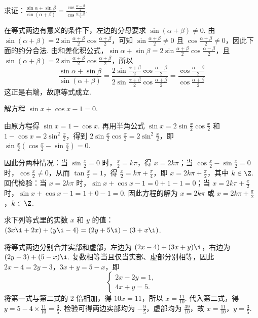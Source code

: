 \begin{problem}
求证：\(\frac{\sin\alpha+\sin\beta}{\sin(\alpha+\beta)}=\frac{\cos\frac{\alpha-\beta}{2}}{\cos\frac{\alpha+\beta}{2}}\).
\end{problem}

\begin{solution}
在等式两边有意义的条件下，左边的分母要求 \(\sin(\alpha+\beta)\neq0\). 由 \(\sin(\alpha+\beta)=2\sin\frac{\alpha+\beta}{2}\cos\frac{\alpha+\beta}{2}\)，可知 \(\sin\frac{\alpha+\beta}{2}\neq0\) 且 \(\cos\frac{\alpha+\beta}{2}\neq0\)，因此下面的约分合法. 由和差化积公式，\(\sin\alpha+\sin\beta=2\sin\frac{\alpha+\beta}{2}\cos\frac{\alpha-\beta}{2}\)，且 \(\sin(\alpha+\beta)=2\sin\frac{\alpha+\beta}{2}\cos\frac{\alpha+\beta}{2}\)，所以
    \[
    \frac{\sin\alpha+\sin\beta}{\sin(\alpha+\beta)}=\frac{2\sin\frac{\alpha+\beta}{2}\cos\frac{\alpha-\beta}{2}}{2\sin\frac{\alpha+\beta}{2}\cos\frac{\alpha+\beta}{2}}=\frac{\cos\frac{\alpha-\beta}{2}}{\cos\frac{\alpha+\beta}{2}}
    \]
    这正是右端，故原等式成立.
\end{solution}

\begin{problem}
解方程 \(\sin x+\cos x-1=0\).
\end{problem}

\begin{solution}
由原方程得 \(\sin x=1-\cos x\). 再用半角公式 \(\sin x=2\sin\frac{x}{2}\cos\frac{x}{2}\) 和 \(1-\cos x=2\sin^2\frac{x}{2}\)，得到 \(2\sin\frac{x}{2}\cos\frac{x}{2}=2\sin^2\frac{x}{2}\)，即 \(\sin\frac{x}{2}\left(\cos\frac{x}{2}-\sin\frac{x}{2}\right)=0\).

    因此分两种情况：当 \(\sin\frac{x}{2}=0\) 时，\(\frac{x}{2}=k\pi\)，得 \(x=2k\pi\)；当 \(\cos\frac{x}{2}-\sin\frac{x}{2}=0\) 时，\(\cos\frac{x}{2}\neq0\)，从而 \(\tan\frac{x}{2}=1\)，得 \(\frac{x}{2}=k\pi+\frac\pi4\)，即 \(x=2k\pi+\frac\pi2\)，其中 \(k\in\Z\). 回代检验：当 \(x=2k\pi\) 时，\(\sin x+\cos x-1=0+1-1=0\)；当 \(x=2k\pi+\frac\pi2\) 时，\(\sin x+\cos x-1=1+0-1=0\). 因此方程的解为 \(x=2k\pi\) 或 \(x=2k\pi+\frac\pi2\)，\(k\in\Z\).
\end{solution}

\begin{problem}
求下列等式里的实数 \(x\) 和 \(y\) 的值：\((3x\i+2x)+(y\i-4)=(2y+5\i)-(3+x\i)\).
\end{problem}

\begin{solution}
将等式两边分别合并实部和虚部，左边为 \((2x-4)+(3x+y)\i\)，右边为 \((2y-3)+(5-x)\i\). 复数相等当且仅当实部、虚部分别相等，因此 \(2x-4=2y-3\)，\(3x+y=5-x\)，即
\[
\begin{cases}
2x-2y=1,\\
4x+y=5.
\end{cases}
\]
将第一式与第二式的 2 倍相加，得 \(10x=11\)，所以 \(x=\frac{11}{10}\). 代入第二式，得 \(y=5-4\times\frac{11}{10}=\frac35\). 检验可得两边实部均为 \(-\frac95\)，虚部均为 \(\frac{39}{10}\)，故 \(x=\frac{11}{10}\)，\(y=\frac35\).
\end{solution}

